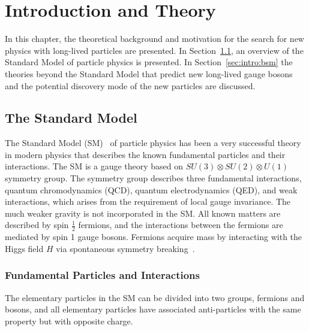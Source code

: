 \chapter{Introduction and Theory}
\label{chap:introduction}

In this chapter, the theoretical background and motivation for the search for new physics with long-lived particles are presented. In Section~\ref{sec:intro:standard_model}, an overview of the Standard Model of particle physics is presented. In Section~\ref{sec:intro:bsm} the theories beyond the Standard Model that predict new long-lived gauge bosons and the potential discovery mode of the new particles are discussed.



\section{The Standard Model}
\label{sec:intro:standard_model}

The Standard Model (SM)~\cite{Burgess:1003111} of particle physics has been a very successful theory in modern physics that describes the known fundamental particles and their interactions. The SM is a gauge theory based on $SU(3) \otimes SU(2) \otimes U(1)$ symmetry group. The symmetry group describes three fundamental interactions, quantum chromodynamics (QCD), quantum electrodynamics (QED), and weak interactions, which arises from the requirement of local gauge invariance. The much weaker gravity is not incorporated in the SM. All known matters are described by spin $\frac{1}{2}$ fermions, and the interactions between the fermions are mediated by spin 1 gauge bosons. Fermions acquire mass by interacting with the Higgs field $H$ via spontaneous symmetry breaking~\cite{Higgs:429539}.

\subsection{Fundamental Particles and Interactions}
\label{sec:intro:fundamental_particles}
The elementary particles in the SM can be divided into two groups, fermions and bosons, and all elementary particles have associated anti-particles with the same property but with opposite charge.

